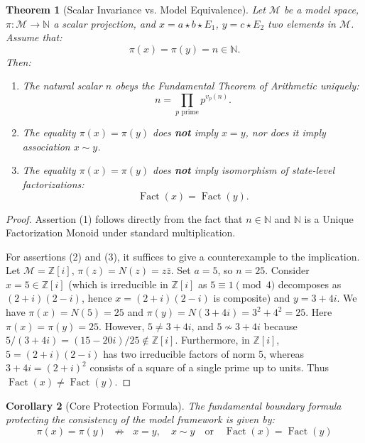 \documentclass[11pt,a4paper,reqno]{amsart}
\newtheorem{theorem}{Theorem}[section]
\newtheorem{corollary}[theorem]{Corollary}
\theoremstyle{definition}
\theoremstyle{remark}
\newcommand{\M}{\mathcal{M}}
\newcommand{\N}{\mathbb{N}}
\newcommand{\Z}{\mathbb{Z}}
\newcommand{\Fact}{\operatorname{Fact}}
\begin{document}
	\begin{theorem}[Scalar Invariance vs. Model Equivalence]
		\label{thm:safeguard}
		Let $\M$ be a model space, $\pi: \M \to \N$ a scalar projection, and $x = a \star b \star E_1$, $y = c \star E_2$ two elements in $\M$. Assume that:
		\begin{equation}
			\pi(x) = \pi(y) = n \in \N.
		\end{equation}
		Then:
		\begin{enumerate}
			\item The natural scalar $n$ obeys the Fundamental Theorem of Arithmetic uniquely:
			\begin{equation}
				n = \prod_{p \text{ prime}} p^{v_p(n)}.
			\end{equation}
			\item The equality $\pi(x) = \pi(y)$ does \textbf{not} imply $x = y$, nor does it imply association $x \sim y$.
			\item The equality $\pi(x) = \pi(y)$ does \textbf{not} imply isomorphism of state-level factorizations:
			\begin{equation}
				\Fact(x) = \Fact(y).
			\end{equation}
		\end{enumerate}
	\end{theorem}
	
	\begin{proof}
		Assertion (1) follows directly from the fact that $n \in \N$ and $\N$ is a Unique Factorization Monoid under standard multiplication. 
		
		For assertions (2) and (3), it suffices to give a counterexample to the implication. Let $\M = \Z[i]$, $\pi(z) = N(z) = z \bar{z}$. Set $a = 5$, so $n = 25$. 
		Consider $x = 5 \in \Z[i]$ (which is irreducible in $\Z[i]$ as $5 \equiv 1 \pmod 4$ decomposes as $(2+i)(2-i)$, hence $x = (2+i)(2-i)$ is composite) and $y = 3 + 4i$.
		We have $\pi(x) = N(5) = 25$ and $\pi(y) = N(3+4i) = 3^2 + 4^2 = 25$. 
		Here $\pi(x) = \pi(y) = 25$. 
		However, $5 \neq 3+4i$, and $5 \not\sim 3+4i$ because $5 / (3+4i) = (15 - 20i)/25 \notin \Z[i]$. 
		Furthermore, in $\Z[i]$, $5 = (2+i)(2-i)$ has two irreducible factors of norm 5, whereas $3+4i = (2+i)^2$ consists of a square of a single prime up to units. Thus $\Fact(x) \neq \Fact(y)$.
	\end{proof}
	
	\begin{corollary}[Core Protection Formula]
		The fundamental boundary formula protecting the consistency of the model framework is given by:
		\begin{equation}
			\boxed{
				\pi(x) = \pi(y) \;\;\not\Rightarrow\;\; x = y, \quad x \sim y \quad \text{or} \quad \Fact(x) = \Fact(y)
			}
		\end{equation}
	\end{corollary}
	
\end{document}
